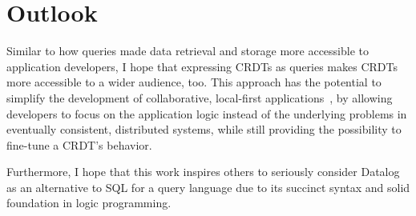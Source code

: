\section{Outlook}\label{sec:outlook}

Similar to how queries made data retrieval and storage more accessible to
application developers, I hope that expressing \acp{CRDT} as queries
makes \acp{CRDT} more accessible to a wider audience, too.
This approach has the potential to simplify the development of
collaborative, local-first applications~\cite{kleppmann2019local},
by allowing developers to focus on the application logic instead of the
underlying problems in eventually consistent, distributed systems, while
still providing the possibility to fine-tune a \ac{CRDT}'s behavior.

Furthermore, I hope that this work inspires others to seriously consider Datalog
as an alternative to SQL for a query language due to its succinct syntax
and solid foundation in logic programming.
